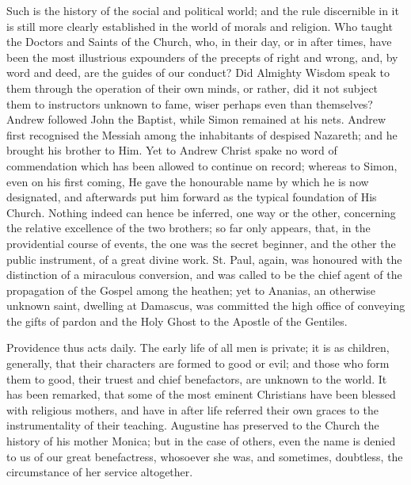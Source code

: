 Such is the history of the social and political world; and the rule
discernible in it is still more clearly established in the world of
morals and religion. Who taught the Doctors and Saints of the Church,
who, in their day, or in after times, have been the most illustrious
expounders of the precepts of right and wrong, and, by word and deed,
are the guides of our conduct? Did Almighty Wisdom speak to them
through the operation of their own minds, or rather, did it not
subject them to instructors unknown to fame, wiser perhaps even than
themselves? Andrew followed John the Baptist, while Simon remained at
his nets. Andrew first recognised the Messiah among the inhabitants of
despised Nazareth; and he brought his brother to Him. Yet to Andrew
Christ spake no word of commendation which has been allowed to
continue on record; whereas to Simon, even on his first coming, He
gave the honourable name by which he is now designated, and afterwards
put him forward as the typical foundation of His Church. Nothing
indeed can hence be inferred, one way or the other, concerning the
relative excellence of the two brothers; so far only appears, that, in
the providential course of events, the one was the secret beginner,
and the other the public instrument, of a great divine work. St. Paul,
again, was honoured with the distinction of a miraculous conversion,
and was called to be the chief agent of the propagation of the Gospel
among the heathen; yet to Ananias, an otherwise unknown saint,
dwelling at Damascus, was committed the high office of conveying the
gifts of pardon and the Holy Ghost to the Apostle of the Gentiles.

Providence thus acts daily. The early life of all men is private;
it is as children, generally, that their characters are formed to good
or evil; and those who form them to good, their truest and chief
benefactors, are unknown to the world. It has been remarked, that some
of the most eminent Christians have been blessed with religious
mothers, and have in after life referred their own graces to the
instrumentality of their teaching. Augustine has preserved to the
Church the history of his mother Monica; but in the case of others,
even the name is denied to us of our great benefactress, whosoever she
was, and sometimes, doubtless, the circumstance of her service
altogether.

